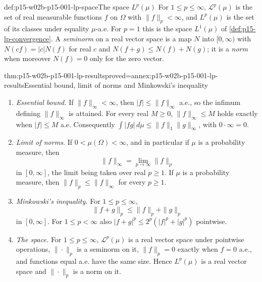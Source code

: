 \begin{hbdefinition}{def:p15-w02b-p15-001-lp-space}{The space \(L^p(\mu)\)}
For \(1\leq p\leq\infty\), \(\mathcal L^p(\mu)\) is the set of real
measurable functions \(f\) on \(\Omega\) with \(\|f\|_p<\infty\), and
\(L^p(\mu)\) is the set of its classes under equality \(\mu\)-a.e.
For \(p=1\) this is the space \(L^1(\mu)\) of
\cref{def:p15-lp-convergence}. A \emph{seminorm} on a real vector space
is a map \(N\) into \([0,\infty)\) with \(N(cf)=|c|N(f)\) for real
\(c\) and \(N(f+g)\leq N(f)+N(g)\); it is a \emph{norm} when moreover
\(N(f)=0\) only for the zero vector.
\end{hbdefinition}

\begin{hbtheorem}{thm:p15-w02b-p15-001-lp-results}{proved=annex:p15-w02b-p15-001-lp-results}{Essential bound, limit of norms and Minkowski's inequality}
\par\nobreak
\begin{enumerate}
\item \emph{Essential bound.} If \(\|f\|_\infty<\infty\), then
      \(|f|\leq\|f\|_\infty\) a.e., so the infimum defining
      \(\|f\|_\infty\) is attained. For every real \(M\geq0\),
      \(\|f\|_\infty\leq M\) holds exactly when \(|f|\leq M\) a.e.
      Consequently
      \(\int|fg|\,d\mu\leq\|f\|_1\|g\|_\infty\), with
      \(0\cdot\infty=0\).
\item \emph{Limit of norms.} If \(0<\mu(\Omega)<\infty\), and in
      particular if \(\mu\) is a probability measure, then
      \[
       \|f\|_\infty=\lim_{p\to\infty}\|f\|_p
      \]
      in \([0,\infty]\), the limit being taken over real \(p\geq1\).
      If \(\mu\) is a probability measure, then
      \(\|f\|_p\leq\|f\|_\infty\) for every \(p\geq1\).
\item \emph{Minkowski's inequality.} For \(1\leq p\leq\infty\),
      \[
       \|f+g\|_p\leq\|f\|_p+\|g\|_p
      \]
      in \([0,\infty]\). For \(1\leq p<\infty\) also
      \(|f+g|^p\leq2^p(|f|^p+|g|^p)\) pointwise.
\item \emph{The space.} For \(1\leq p\leq\infty\),
      \(\mathcal L^p(\mu)\) is a real vector space under pointwise
      operations, \(\|\cdot\|_p\) is a seminorm on it, \(\|f\|_p=0\)
      exactly when \(f=0\) a.e., and functions equal a.e. have the same
      size. Hence \(L^p(\mu)\) is a real vector space and
      \(\|\cdot\|_p\) is a norm on it.
\end{enumerate}
\end{hbtheorem}

